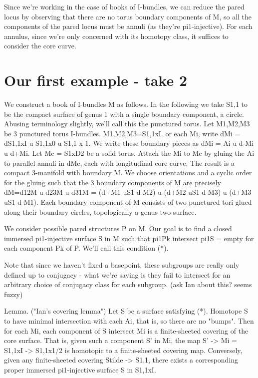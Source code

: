 \documentclass[12pt]{amsart}
\theoremstyle{definition}
\begin{document}
Since we're working in the case of books of I-bundles, we can reduce the pared
locus by observing that there are no torus boundary components of M, so all the
components of the pared locus must be annuli (as they're pi1-injective). For
each annulus, since we're only concerned with its homotopy class, it suffices
to consider the core curve.

\section{Our first example - take 2}

We construct a book of I-bundles M as follows. In the following we take S1,1 to
be the compact surface of genus 1 with a single boundary component, a circle.
Abusing terminology slightly, we'll call this the punctured torus.
Let M1,M2,M3 be 3 punctured
torus I-bundles. M1,M2,M3=S1,1xI. or each Mi, write dMi = dS1,1xI u S1,1x0
u S1,1 x 1. We write these boundary pieces as dMi = Ai u d-Mi u d+Mi. Let Mc
= S1xD2 be a solid torus. Attach the Mi to Mc by gluing the Ai to parallel
annuli in dMc, each with longitudinal core curve. The result is a compact
3-manifold with boundary M. We choose orientations and a cyclic order for the
gluing such that the 3 boundary components of M are precisely
dM=d12M u d23M u d31M = (d+M1 uS1 d-M2) u (d+M2 uS1 d-M3) u (d+M3 uS1 d-M1).
Each boundary component of M consists of two punctured tori glued along their
boundary circles, topologically a genus two surface.

We consider possible pared structures P on M. Our goal is to find a closed
immersed pi1-injective surface S in M such that pi1Pk intersect pi1S = empty
for each component Pk of P. We'll call this condition (*).

Note that since we
haven't fixed a basepoint, these subgroups are really only defined up to
conjugacy - what we're saying is they fail to intersect for an arbitrary choice
of conjugacy class for each subgroup. (ask Ian about this? seems fuzzy)

Lemma. ("Ian's covering lemma") Let S be a surface satisfying (*). Homotope
S to have minimal intersection with each Ai, that is, so there are no "bumps".
Then for each Mi, each component of S intersect Mi is a finite-sheeted covering
of the core surface. That is, given such a component S' in Mi, the map S' -> Mi
= S1,1xI -> S1,1x{1/2} is homotopic to a finite-sheeted covering
map. Conversely, given any finite-sheeted covering Stilde -> S1,1, there
exists a corresponding proper immersed pi1-injective surface S in S1,1xI.
\end{document}
